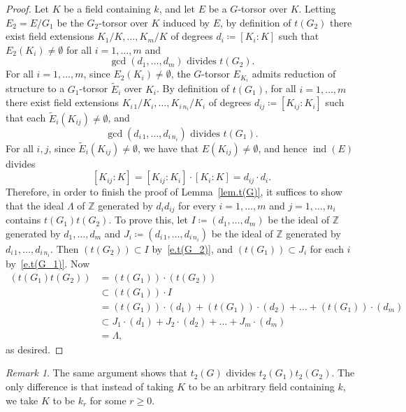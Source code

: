 \documentclass[12pt]{amsart}
\numberwithin{equation}{section}
\theoremstyle{remark}
\newtheorem{remark}[theorem]{Remark}
\newcommand{\ind}{\operatorname{ind}}
\begin{document}
\begin{proof} Let $K$ be a field containing $k$, and let $E$ be a $G$-torsor over $K$.  
Letting $E_2=E/G_1$ be the $G_2$-torsor over $K$ induced by $E$, by definition of $t(G_2)$ there exist field extensions $K_1/K, \ldots, K_m/K$ of degrees $d_i\coloneqq [K_i : K]$ such that $E_2(K_i)\neq\emptyset$ for all $i=1,\dots,m$ and 
\begin{equation} \label{e.t(G_2)}
\text{$\gcd(d_1, \ldots, d_m)$ divides $t(G_2)$.}
\end{equation}
For all $i=1,\dots,m$, since $E_2(K_i)\neq\emptyset$, the $G$-torsor $E_{K_i}$ admits reduction of structure to a $G_1$-torsor $\tilde{E}_i$ over $K_i$. By definition of $t(G_1)$, for all $i = 1, \ldots, m$ there exist field extensions $K_{i\, 1}/K_i, \ldots, K_{i\,n_i}/K_i$ of degrees $d_{ij} \coloneqq [K_{ij}: K_i]$ such that each $\tilde{E}_i(K_{ij})\neq\emptyset$, and
\begin{equation} \label{e.t(G_1)}
\text{$\gcd(d_{i\, 1}, \ldots, d_{i\, n_i})$ divides $t(G_1)$.}
\end{equation} 
For all $i,j$, since $\tilde{E}_i(K_{ij})\neq\emptyset$, we have that $E(K_{ij})\neq\emptyset$, and hence $\ind(E)$ divides  
\[ [K_{ij}: K] = [K_{ij}: K_i] \cdot [K_i: K] = d_{ij} \cdot d_i.\]
Therefore, in order to finish the proof of Lemma~\ref{lem.t(G)}, it suffices to show that the ideal $\Lambda$ of $\mathbb Z$ generated by $d_i d_{ij}$ for every $i = 1, \ldots, m$ and $j = 1, \ldots, n_i$ contains $t(G_1) t(G_2)$. To prove this, let $I \coloneqq (d_1, \ldots, d_m) $ be the ideal of $\mathbb Z$ generated by $d_1, \ldots, d_m$ and $J_i \coloneqq (d_{i\, 1}, \ldots, d_{i\, n_i})$ be the ideal of $\mathbb Z$ generated by $d_{i\, 1}, \ldots, d_{i\, n_i}$. Then $(t(G_2)) \subset I$ by~\eqref{e.t(G_2)}, and $(t(G_1)) \subset J_i$ for each $i$  by~\eqref{e.t(G_1)}. Now
\begin{align*}
(t(G_1)t(G_2))
&= (t(G_1)) \cdot (t(G_2)) \\
&\subset (t(G_1)) \cdot I \\
&= (t(G_1)) \cdot (d_1) + (t(G_1)) \cdot (d_2) + \ldots
   + (t(G_1)) \cdot (d_m) \\
&\subset J_1 \cdot (d_1) + J_2 \cdot (d_2) + \ldots + J_m \cdot (d_m) \\
&= \Lambda,
\end{align*}
as desired.     
\end{proof}

\begin{remark} The same argument shows that $t_2(G)$ divides $t_2(G_1)t_2(G_2)$. The only difference is that instead of taking $K$ to be an arbitrary field containing $k$, we take $K$ to be $k_r$ for some $r \geqslant 0$. 
\end{remark}
\end{document}
